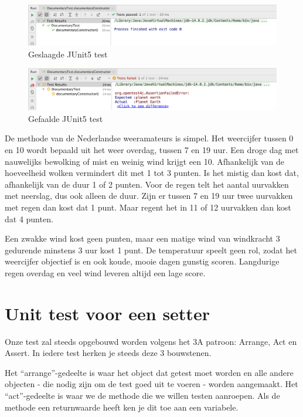 \begin{figure}[H]
  \includegraphics[width=\linewidth]{images/chapter-junit/junit_test_passed.png}
  \caption{Geslaagde JUnit5 test}
  \label{fig:test_passed}
\end{figure}

\begin{figure}[H]
  \includegraphics[width=\linewidth]{images/chapter-junit/junit_test_failed.png}
  \caption{Gefaalde JUnit5 test}
  \label{fig:test_failed}
\end{figure}



De methode van de Nederlandse weeramateurs is simpel. Het weercijfer tussen 0 en 10 wordt bepaald uit het weer overdag, tussen 7 en 19 uur. Een droge dag met nauwelijks bewolking of mist en weinig wind krijgt een 10. Afhankelijk van de hoeveelheid wolken vermindert dit met 1 tot 3 punten. Is het mistig dan kost dat, afhankelijk van de duur 1 of 2 punten. Voor de regen telt het aantal uurvakken met neerslag, dus ook alleen de duur. Zijn er tussen 7 en 19 uur twee uurvakken met regen dan kost dat 1 punt. Maar regent het in 11 of 12 uurvakken dan kost dat 4 punten.

Een zwakke wind kost geen punten, maar een matige wind van windkracht 3 gedurende minstens 3 uur kost 1 punt. De temperatuur speelt geen rol, zodat het weercijfer objectief is en ook koude, mooie dagen gunstig scoren. Langdurige regen overdag en veel wind leveren altijd een lage score.

\section{Unit test voor een setter}

Onze test zal steeds opgebouwd worden volgens het 3A patroon: Arrange, Act en Assert.
In iedere test herken je steeds deze 3 bouwstenen. 

Het ``arrange''-gedeelte is waar het object dat getest moet worden en alle andere objecten - die nodig zijn om de test goed uit te voeren - worden aangemaakt. 
Het ``act''-gedeelte is waar we de methode die we willen testen aanroepen. Als de methode een returnwaarde heeft ken je dit toe aan een variabele.

